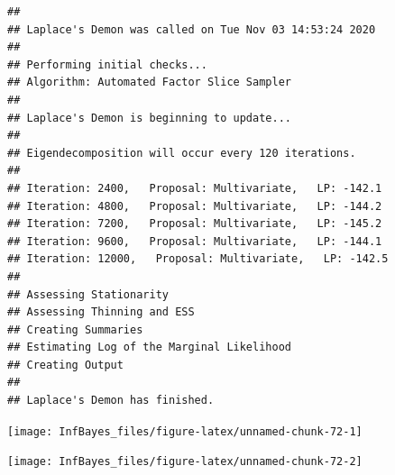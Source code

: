 \documentclass[
]{book}
\newenvironment{Shaded}{\begin{snugshade}}{\end{snugshade}}
\newcommand{\DataTypeTok}[1]{\textcolor[rgb]{0.13,0.29,0.53}{#1}}
\newcommand{\DecValTok}[1]{\textcolor[rgb]{0.00,0.00,0.81}{#1}}
\newcommand{\KeywordTok}[1]{\textcolor[rgb]{0.13,0.29,0.53}{\textbf{#1}}}
\newcommand{\NormalTok}[1]{#1}
\newcommand{\OperatorTok}[1]{\textcolor[rgb]{0.81,0.36,0.00}{\textbf{#1}}}
\newcommand{\OtherTok}[1]{\textcolor[rgb]{0.56,0.35,0.01}{#1}}
\newcommand{\StringTok}[1]{\textcolor[rgb]{0.31,0.60,0.02}{#1}}
\begin{document}
\begin{verbatim}
## 
## Laplace's Demon was called on Tue Nov 03 14:53:24 2020
## 
## Performing initial checks...
## Algorithm: Automated Factor Slice Sampler 
## 
## Laplace's Demon is beginning to update...
## 
## Eigendecomposition will occur every 120 iterations.
## 
## Iteration: 2400,   Proposal: Multivariate,   LP: -142.1
## Iteration: 4800,   Proposal: Multivariate,   LP: -144.2
## Iteration: 7200,   Proposal: Multivariate,   LP: -145.2
## Iteration: 9600,   Proposal: Multivariate,   LP: -144.1
## Iteration: 12000,   Proposal: Multivariate,   LP: -142.5
## 
## Assessing Stationarity
## Assessing Thinning and ESS
## Creating Summaries
## Estimating Log of the Marginal Likelihood
## Creating Output
## 
## Laplace's Demon has finished.
\end{verbatim}

\begin{Shaded}
\end{Shaded}

\begin{center}\texttt{[image: InfBayes\_files/figure-latex/unnamed-chunk-72-1]} \end{center}

\begin{center}\texttt{[image: InfBayes\_files/figure-latex/unnamed-chunk-72-2]} \end{center}
\end{document}
